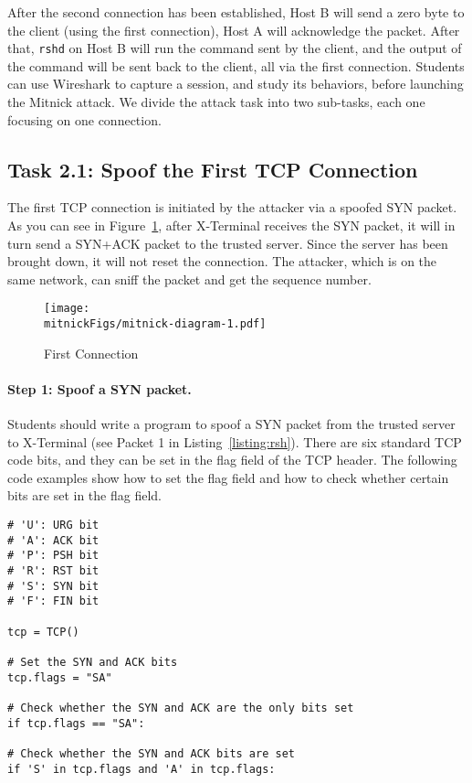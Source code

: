 After the second connection has been established, 
Host B will send a zero byte to the client (using the first connection),
Host A will acknowledge the packet. After that, \texttt{rshd} on Host B
will run the command sent by the client, and the
output of the command will be sent back to the client, all via the 
first connection. 
Students can use Wireshark to capture a \rsh session, and study its
behaviors, before launching the Mitnick attack. 
We divide the attack task into two sub-tasks, each one focusing on one connection. 



\subsection{Task 2.1: Spoof the First TCP Connection}
\label{sec:first-conn}

The first TCP connection is initiated by the attacker via a spoofed SYN packet. As you can see
in Figure~\ref{fig:first-conn}, after X-Terminal receives the SYN packet, it will in turn send
a SYN+ACK packet to the trusted server. Since the server has been brought down, it will not
reset the connection. The attacker, which is on the same network, can sniff the packet and get
the sequence number.

\begin{figure}[htb]
\centering
\texttt{[image: \\mitnickFigs/mitnick-diagram-1.pdf]}
\caption{First Connection}
\label{fig:first-conn}
\end{figure}


\paragraph{Step 1: Spoof a SYN packet.}
Students should write a program to spoof a SYN packet 
from the trusted server to X-Terminal (see Packet 1 in Listing~\ref{listing:rsh}). 
There are six standard 
TCP code bits, and they can be set in the flag field of the TCP header. 
The following code examples show how to set the flag field
and how to check whether certain bits are set in
the flag field. 

\begin{lstlisting}
# 'U': URG bit
# 'A': ACK bit
# 'P': PSH bit
# 'R': RST bit
# 'S': SYN bit
# 'F': FIN bit

tcp = TCP()

# Set the SYN and ACK bits
tcp.flags = "SA"

# Check whether the SYN and ACK are the only bits set
if tcp.flags == "SA": 

# Check whether the SYN and ACK bits are set
if 'S' in tcp.flags and 'A' in tcp.flags: 
\end{lstlisting}

